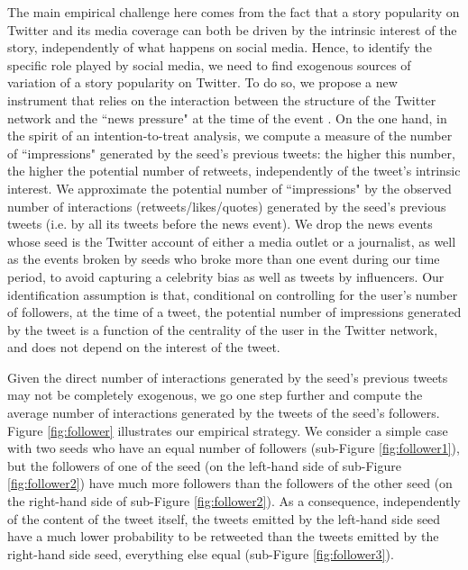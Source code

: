 The main empirical challenge here comes from the fact that a story popularity on Twitter and its media coverage can both be driven by the intrinsic interest of the story, independently of what happens on social media. Hence, to identify the specific role played by social media, we need to find exogenous sources of variation of a story popularity on Twitter. To do so, we propose a new instrument that relies on the interaction between the structure of the Twitter network and the ``news pressure" at the time of the event \citep[in the spirit of][]{EisenseeStromberg2007}. On the one hand, in the spirit of an intention-to-treat analysis, we compute a measure of the number of ``impressions" generated by the seed's previous tweets: the higher this number, the higher the potential number of retweets, independently of the tweet's intrinsic interest. We approximate the potential number of ``impressions" by the observed number of interactions (retweets/likes/quotes) generated by the seed's previous tweets (i.e. by all its tweets before the news event). We drop the news events whose seed is the Twitter account of either a media outlet or a journalist, as well as the events broken by seeds who broke more than one event during our time period, to avoid capturing a celebrity bias as well as tweets by influencers. Our identification assumption is that, conditional on controlling for the user's number of followers, at the time of a tweet, the potential number of impressions generated by the tweet is a function of the centrality of the user in the Twitter network, and does not depend on the interest of the tweet.

Given the direct number of interactions generated by the seed's previous tweets may not be completely exogenous, we go one step further and compute the average number of interactions generated by the tweets of the seed's followers. Figure \ref{fig:follower} illustrates our empirical strategy. We consider a simple case with two seeds who have an equal number of followers (sub-Figure \ref{fig:follower1}), but the followers of one of the seed (on the left-hand side of sub-Figure \ref{fig:follower2}) have much more followers than the followers of the other seed (on the right-hand side of sub-Figure \ref{fig:follower2}). As a consequence, independently of the content of the tweet itself, the tweets emitted by the left-hand side seed have a much lower probability to be retweeted than the tweets emitted by the right-hand side seed, everything else equal (sub-Figure \ref{fig:follower3}).


